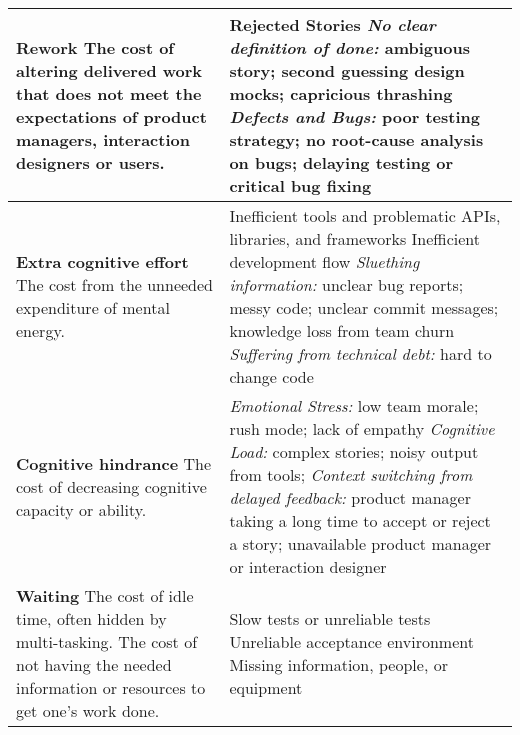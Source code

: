 \begin{table*}[htbp]
\begin{tabular}{|p{2.5in}|p{3.6in}|}
\\ \hline
\textbf{Rework } \newline The cost of altering delivered work that does not meet the expectations of product managers, interaction designers or users.    & Rejected Stories \newline \textit{No clear definition of done:} ambiguous story; second guessing design mocks; capricious thrashing \newline \textit{Defects and Bugs:} poor testing strategy; no root-cause analysis on bugs; delaying testing or critical bug fixing                                                                                                                                                                    \\ \hline
\textbf{Extra cognitive effort} \newline   The cost from the unneeded expenditure of mental energy.                                                                                                                 & Inefficient tools and problematic APIs, libraries, and frameworks  \newline Inefficient development flow \newline \textit{Sluething information:} unclear bug reports; messy code; unclear commit messages; knowledge loss from team churn \newline\textit{Suffering from technical debt:} hard to change code
                                                                     \\ \hline
\textbf{Cognitive hindrance} \newline The cost of decreasing cognitive capacity or ability.                        & \textit{Emotional Stress:} low team morale; rush mode; lack of empathy \newline \textit{Cognitive Load:} complex stories; noisy output from tools; \newline \textit{Context switching from delayed feedback:} product manager taking a long time to accept or reject a story; unavailable product manager or interaction designer                                                                                                                                                        \\ \hline
\textbf{Waiting} \newline The cost of idle time, often hidden by multi-tasking. The cost of not having the needed information or resources to get one's work done. & Slow tests or unreliable tests \newline Unreliable acceptance environment \newline Missing information, people, or equipment                                                                                                                                                                                                                                                                            \\ \hline

\end{tabular}
\end{table*}
